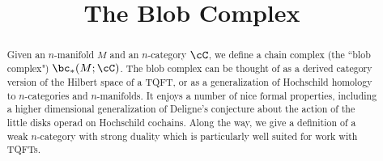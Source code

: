 \documentclass[11pt,leqno]{article}
\title{The Blob Complex}
\begin{document}
\makeatletter
{}
\gdef\theequation{\thesection.\arabic{equation}}
\makeatother

\maketitle

%

\begin{abstract}
Given an $n$-manifold $M$ and an $n$-category $\cC$, we define a chain complex
(the ``blob complex") $\bc_*(M; \cC)$.
The blob complex can be thought of as a derived category version of the Hilbert space of a TQFT, 
or as a generalization of Hochschild homology to $n$-categories and $n$-manifolds.
It enjoys a number of nice formal properties, including a higher dimensional
generalization of Deligne's conjecture about the action of the little disks operad on Hochschild cochains.
Along the way, we give a definition of a weak $n$-category with strong duality which
is particularly well suited for work with TQFTs.
\end{abstract}


\tableofcontents



















\end{document}
